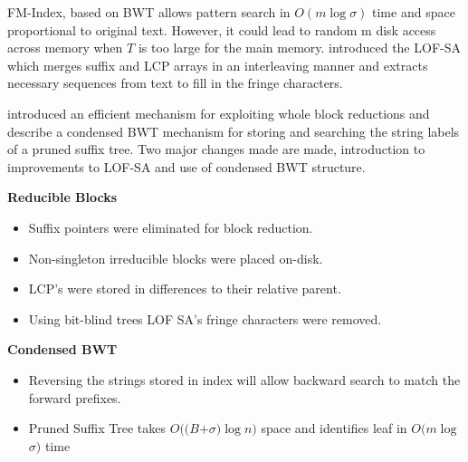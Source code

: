 FM-Index, based on BWT allows pattern search in $O(m \log \sigma)$ time and space proportional to original text. However, it could lead to random m disk access across memory when $T$
 is too large for the main memory. {\citet{spmt08sigmod}} introduced the LOF-SA which merges suffix and LCP arrays in an interleaving manner and extracts necessary sequences from text to fill in the fringe characters. 

{\citet{gmctw14}} introduced %
an efficient mechanism for exploiting whole block reductions and describe a condensed 
BWT mechanism for storing and searching the string labels of a pruned suffix tree. Two major changes made are made, introduction to improvements to LOF-SA and use of condensed BWT structure.

\textbf{Reducible Blocks}
\begin{itemize}
\item Suffix pointers were eliminated for block reduction.
\item  Non-singleton irreducible blocks were placed on-disk. 
\item LCP's were stored in differences to their relative parent.
\item Using bit-blind trees LOF SA's fringe characters were removed. 

\end{itemize}

\textbf{Condensed BWT}
\begin{itemize}
\item  Reversing the strings stored in index will allow backward search to match the forward prefixes.
\item Pruned Suffix Tree takes $O$$($$($$B$$+$$\sigma$$)$$\log$$n$$)$ space and identifies leaf in $O$$($$m$$\log$$\sigma$$)$ time
\end{itemize}














  
